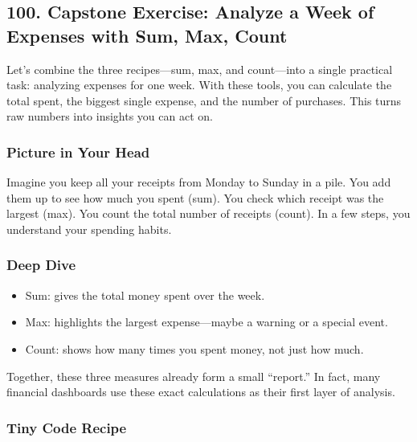\documentclass[
  letterpaper,
  DIV=11,
  numbers=noendperiod]{scrreprt}
\providecommand{\tightlist}{%
  \setlength{\itemsep}{0pt}\setlength{\parskip}{0pt}}
\begin{document}
\subsection{100. Capstone Exercise: Analyze a Week of Expenses with Sum,
Max,
Count}\label{capstone-exercise-analyze-a-week-of-expenses-with-sum-max-count}

Let's combine the three recipes---sum, max, and count---into a single
practical task: analyzing expenses for one week. With these tools, you
can calculate the total spent, the biggest single expense, and the
number of purchases. This turns raw numbers into insights you can act
on.

\subsubsection{Picture in Your Head}\label{picture-in-your-head-100}

Imagine you keep all your receipts from Monday to Sunday in a pile. You
add them up to see how much you spent (sum). You check which receipt was
the largest (max). You count the total number of receipts (count). In a
few steps, you understand your spending habits.

\subsubsection{Deep Dive}\label{deep-dive-70}

\begin{itemize}
\tightlist
\item
  Sum: gives the total money spent over the week.
\item
  Max: highlights the largest expense---maybe a warning or a special
  event.
\item
  Count: shows how many times you spent money, not just how much.
\end{itemize}

Together, these three measures already form a small ``report.'' In fact,
many financial dashboards use these exact calculations as their first
layer of analysis.

\subsubsection{Tiny Code Recipe}\label{tiny-code-recipe-98}
\end{document}
